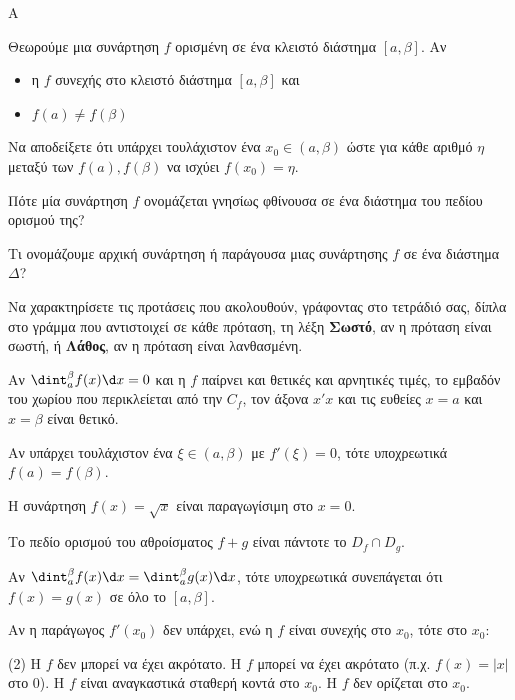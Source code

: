 \begin{thema}{A}
\begin{erwthma}
    \item Θεωρούμε μια συνάρτηση $f$ ορισμένη σε ένα κλειστό διάστημα $[a,\beta]$. Αν
\begin{itemize}
\item η $f$ συνεχής στο κλειστό διάστημα $[a,\beta]$ και 
\item $f(a)\neq f(\beta)$
\end{itemize}
Να αποδείξετε ότι υπάρχει τουλάχιστον ένα $ x_0\in(a,\beta) $ ώστε για κάθε αριθμό $ \eta $ μεταξύ των $ f(a),f(\beta) $ να ισχύει $ f(x_0)=\eta $.
    \item Πότε μία συνάρτηση $f$ ονομάζεται γνησίως φθίνουσα σε ένα διάστημα του πεδίου ορισμού της?
    \item Τι ονομάζουμε αρχική συνάρτηση ή παράγουσα μιας συνάρτησης $f$ σε ένα διάστημα $\Delta$?
    \item Να χαρακτηρίσετε τις προτάσεις που ακολουθούν, γράφοντας στο τετράδιό σας, δίπλα στο γράμμα που αντιστοιχεί σε κάθε πρόταση, τη λέξη \textbf{Σωστό}, αν η πρόταση είναι σωστή, ή \textbf{Λάθος}, αν η πρόταση είναι λανθασμένη.
    \begin{alist}
        \item Αν $\dint_a^\beta f(x) \d x = 0$ και η $f$ παίρνει και θετικές και αρνητικές τιμές, το εμβαδόν του χωρίου που περικλείεται από την $C_f$, τον άξονα $x'x$ και τις ευθείες $x=a$ και $x=\beta$ είναι θετικό.
        \item Αν υπάρχει τουλάχιστον ένα $\xi \in (a, \beta)$ με $f'(\xi)=0$, τότε υποχρεωτικά $f(a)=f(\beta)$.
        \item Η συνάρτηση $f(x) = \sqrt{x}$ είναι παραγωγίσιμη στο $x=0$.
        \item Το πεδίο ορισμού του αθροίσματος $f+g$ είναι πάντοτε το $D_f\cap D_g$.
        \item Αν $\dint_a^\beta f(x) \d x = \dint_a^\beta g(x) \d x$, τότε υποχρεωτικά συνεπάγεται ότι $f(x) = g(x)$ σε όλο το $[a, \beta]$.
    \end{alist}
    \item Αν η παράγωγος $f'(x_0)$ δεν υπάρχει, ενώ η $f$ είναι συνεχής στο $x_0$, τότε στο $x_0$:
    \begin{tasks}[label=\let\textdexiakeraia\relax\alph*.](2)
        \task Η $f$ δεν μπορεί να έχει ακρότατο.
        \task Η $f$ μπορεί να έχει ακρότατο (π.χ. $f(x)=|x|$ στο $0$).
        \task Η $f$ είναι αναγκαστικά σταθερή κοντά στο $x_0$.
        \task Η $f$ δεν ορίζεται στο $x_0$.
    \end{tasks}
\end{erwthma}
\end{thema}

